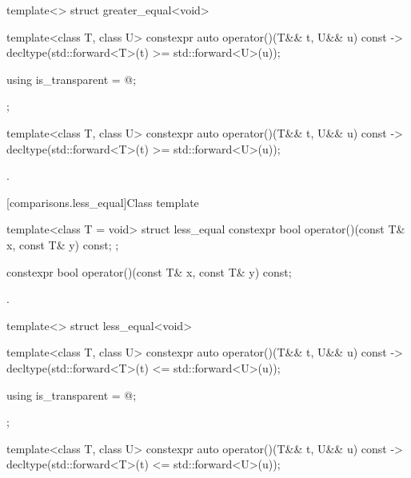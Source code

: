 %
\begin{itemdecl}
template<> struct greater_equal<void> {
  template<class T, class U> constexpr auto operator()(T&& t, U&& u) const
    -> decltype(std::forward<T>(t) >= std::forward<U>(u));

  using is_transparent = @\unspec@;
};
\end{itemdecl}

%
\begin{itemdecl}
template<class T, class U> constexpr auto operator()(T&& t, U&& u) const
    -> decltype(std::forward<T>(t) >= std::forward<U>(u));
\end{itemdecl}

\begin{itemdescr}
\pnum\returns {}.
\end{itemdescr}

[comparisons.less_equal]{Class template }

%
\begin{itemdecl}
template<class T = void> struct less_equal {
  constexpr bool operator()(const T& x, const T& y) const;
};
\end{itemdecl}

%
\begin{itemdecl}
constexpr bool operator()(const T& x, const T& y) const;
\end{itemdecl}

\begin{itemdescr}
\pnum\returns {}.
\end{itemdescr}

%
\begin{itemdecl}
template<> struct less_equal<void> {
  template<class T, class U> constexpr auto operator()(T&& t, U&& u) const
    -> decltype(std::forward<T>(t) <= std::forward<U>(u));

  using is_transparent = @\unspec@;
};
\end{itemdecl}

%
\begin{itemdecl}
template<class T, class U> constexpr auto operator()(T&& t, U&& u) const
    -> decltype(std::forward<T>(t) <= std::forward<U>(u));
\end{itemdecl}

